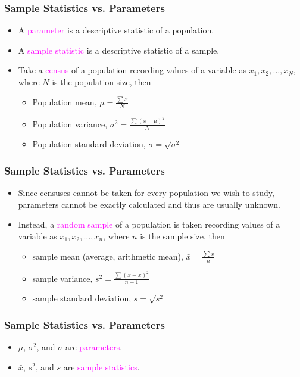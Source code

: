 \documentclass[xcolor=dvipsnames,12pt]{beamer}
\begin{document}

\begin{frame}
\frametitle{Sample Statistics vs. Parameters}
\begin{itemize}
\item A \textcolor{magenta}{parameter} is a descriptive statistic of a population.
\item A \textcolor{magenta}{sample statistic} is a descriptive statistic of a
sample.
\item Take a \textcolor{magenta}{census} of a population recording values of
 a variable as $x_1, x_2,\ldots,x_N$, where $N$ is the population
size, then
\begin{itemize}
\item Population mean, $\mu=\frac{\textstyle\sum x}{N}$
\item Population variance, $\sigma^2=\frac{\textstyle\sum (x-\mu)^2}{N}$
\item Population standard deviation, $\sigma=\sqrt{\sigma^2}$
\end{itemize}
\end{itemize}
\end{frame}


\begin{frame}
\frametitle{Sample Statistics vs. Parameters}
\begin{itemize}
\item Since censuses cannot be taken for every population we wish to study, 
parameters  cannot be exactly calculated and thus are usually
unknown.
\item Instead, a \textcolor{magenta}{random sample} of a population is taken recording  values of
a variable as $x_1, x_2,\ldots,x_n$, where $n$ is the sample
size, then
\begin{itemize}
\item sample mean (average, arithmetic mean), $\bar{x}= \frac{\textstyle \sum x}{n}$
\item  sample variance, $s^2=\frac{\textstyle \sum (x-\bar{x})^2}{n-1}$
\item sample standard deviation, $s=\sqrt{s^2}$
\end{itemize}
\end{itemize}
\end{frame}


\begin{frame}
\frametitle{Sample Statistics vs. Parameters}
\begin{itemize}
\item $\mu$, $\sigma^2$, and $\sigma$ are \textcolor{magenta}{parameters}.
\item $\bar{x}$, $s^2$, and $s$ are \textcolor{magenta}{sample statistics}.
\end{itemize}
\end{frame}
\end{document}
